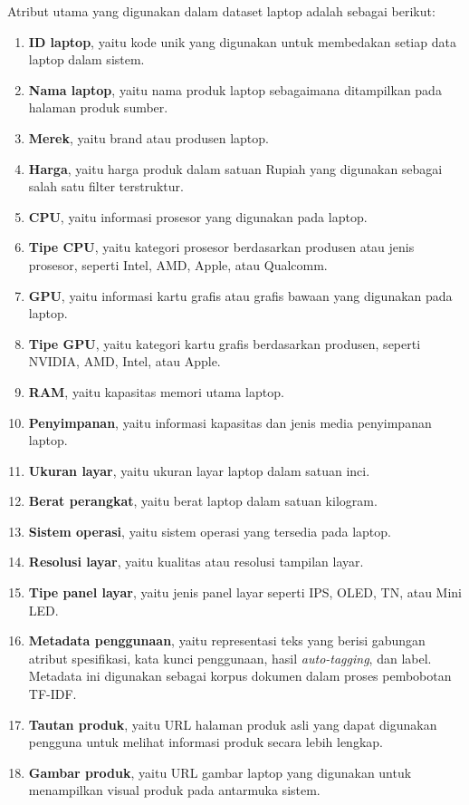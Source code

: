 \noindent Atribut utama yang digunakan dalam dataset laptop adalah sebagai berikut:
\begin{enumerate}
\item \textbf{ID laptop}, yaitu kode unik yang digunakan untuk membedakan setiap data laptop dalam sistem.
\item \textbf{Nama laptop}, yaitu nama produk laptop sebagaimana ditampilkan pada halaman produk sumber.
\item \textbf{Merek}, yaitu brand atau produsen laptop.
\item \textbf{Harga}, yaitu harga produk dalam satuan Rupiah yang digunakan sebagai salah satu filter terstruktur.
\item \textbf{CPU}, yaitu informasi prosesor yang digunakan pada laptop.
\item \textbf{Tipe CPU}, yaitu kategori prosesor berdasarkan produsen atau jenis prosesor, seperti Intel, AMD, Apple, atau Qualcomm.
\item \textbf{GPU}, yaitu informasi kartu grafis atau grafis bawaan yang digunakan pada laptop.
\item \textbf{Tipe GPU}, yaitu kategori kartu grafis berdasarkan produsen, seperti NVIDIA, AMD, Intel, atau Apple.
\item \textbf{RAM}, yaitu kapasitas memori utama laptop.
\item \textbf{Penyimpanan}, yaitu informasi kapasitas dan jenis media penyimpanan laptop.
\item \textbf{Ukuran layar}, yaitu ukuran layar laptop dalam satuan inci.
\item \textbf{Berat perangkat}, yaitu berat laptop dalam satuan kilogram.
\item \textbf{Sistem operasi}, yaitu sistem operasi yang tersedia pada laptop.
\item \textbf{Resolusi layar}, yaitu kualitas atau resolusi tampilan layar.
\item \textbf{Tipe panel layar}, yaitu jenis panel layar seperti IPS, OLED, TN, atau Mini LED.
\item \textbf{Metadata penggunaan}, yaitu representasi teks yang berisi gabungan atribut spesifikasi, kata kunci penggunaan, hasil \textit{auto-tagging}, dan label. Metadata ini digunakan sebagai korpus dokumen dalam proses pembobotan TF-IDF.
\item \textbf{Tautan produk}, yaitu URL halaman produk asli yang dapat digunakan pengguna untuk melihat informasi produk secara lebih lengkap.
\item \textbf{Gambar produk}, yaitu URL gambar laptop yang digunakan untuk menampilkan visual produk pada antarmuka sistem.
\end{enumerate}

